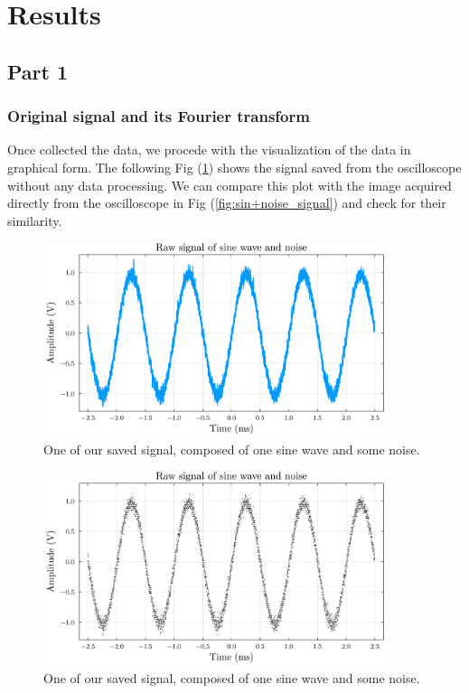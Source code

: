 \documentclass[a4paper,12pt]{article}
\begin{document}
\section{Results}
\subsection{Part 1}
\subsubsection{Original signal and its Fourier transform}
\par Once collected the data, we procede with the visualization of the data 
in graphical form. The following Fig (\ref{plot:raw_signal_and_noise}) 
shows the signal saved from the oscilloscope without any data processing. 
We can compare this plot with the image acquired directly from the oscilloscope
in Fig (\ref{fig:sin+noise_signal}) and check for their similarity.
\begin{figure}[H]
    \centering
    \includegraphics[width=0.9\textwidth]{signal01.pdf}
    \caption{One of our saved signal, composed of one sine wave and some noise.}
    \label{plot:raw_signal_and_noise}
\end{figure}
\begin{figure}[H]
    \centering
    \includegraphics[width=0.9\textwidth]{signal01_scatter.pdf}
    \caption{One of our saved signal, composed of one sine wave and some noise.}
    \label{plot:raw_signal_and_noise_scatter}
\end{figure}
\end{document}
